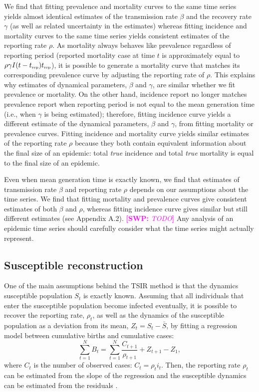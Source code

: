 \documentclass{article}
\newcommand{\comment}[3]{\textcolor{#1}{\textbf{[#2: }\textsl{#3}\textbf{]}}}
\newcommand{\swp}[1]{\comment{magenta}{SWP}{#1}}
\newcommand{\tsub}[2]{#1_{{\textrm{\tiny #2}}}}
\begin{document}
We find that fitting prevalence and mortality curves to the same time series yields almost identical estimates of the transmission rate $\beta$ and the recovery rate $\gamma$ (as well as related uncertainty in the estimates) whereas fitting incidence and mortality curves to the same time series yields consistent estimates of the reporting rate $\rho$.
As mortality always behaves like prevalence regardless of reporting period (reported mortality case at time $t$ is approximately equal to $\rho \gamma I(t-\tsub{t}{rep}) \tsub{t}{rep}$),
it is possible to generate a mortality curve that matches its corresponding prevalence curve by adjusting the reporting rate of $\rho$.
This explains why estimates of dynamical parameters, $\beta$ and $\gamma$, are similar whether we fit prevalence or mortality.
On the other hand, incidence report no longer matches prevalence report when reporting period is not equal to the mean generation time (i.e., when $\gamma$ is being estimated); therefore, fitting incidence curve yields a different estimate of the dynamical parameters, $\beta$ and $\gamma$, from fitting mortality or prevalence curves.
Fitting incidence and mortality curve yields similar estimates of the reporting rate $\rho$ because they both contain equivalent information about the final size of an epidemic: total \emph{true} incidence and total \emph{true} mortality is equal to the final size of an epidemic.

Even when mean generation time is exactly known, we find that estimates of transmission rate $\beta$ and reporting rate $\rho$ depends on our assumptions about the time series.
We find that fitting mortality and prevalence curves give consistent estimates of both $\beta$ and $\rho$, whereas fitting incidence curve gives similar but still different estimates (see Appendix A.2). \swp{TODO}
Any analysis of an epidemic time series should carefully consider what the time series might actually represent.

\subsection{Susceptible reconstruction}

One of the main assumptions behind the TSIR method is that the dynamics susceptible population $S_t$ is exactly known.
Assuming that all individuals that enter the susceptible population become infected eventually, it is possible to recover the reporting rate, $\rho_t$, as well as the dynamics of the susceptible population as a deviation from its mean, $Z_t = S_t - \bar{S}$, by fitting a regression model between cumulative births and cumulative cases: 
\begin{equation}
\sum_{t=1}^N B_t = \sum_{t=1}^N \frac{C_{t+1}}{\rho_{t+1}} + Z_{t+1} - Z_1,
\end{equation}
where $C_t$ is the number of observed cases: $C_t = \rho_t i_t$.
Then, the reporting rate $\rho_t$ can be estimated from the slope of the regression and the susceptible dynamics can be estimated from the residuals \citep{finkenstadt2000time}. 
\end{document}
